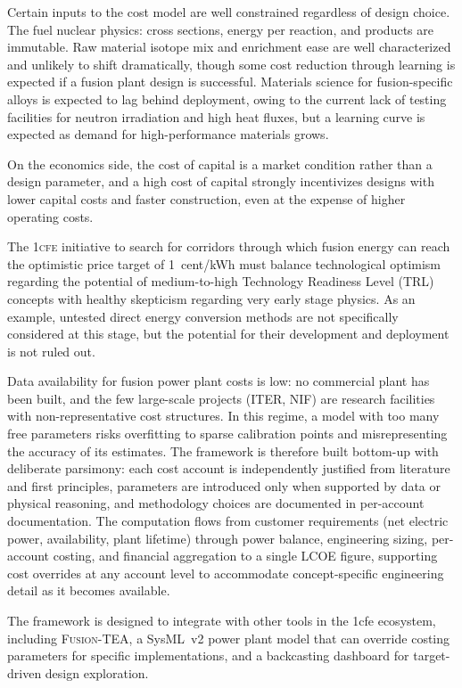 \documentclass{article}
\begin{document}
Certain inputs to the cost model are well constrained regardless of design
choice. The fuel nuclear physics: cross sections, energy per reaction, and
products are immutable. Raw material isotope mix and enrichment ease are
well characterized and unlikely to shift dramatically, though some cost
reduction through learning is expected if a fusion plant design is successful.
Materials science for fusion-specific alloys is expected to lag behind deployment,
owing to the current lack of testing facilities for neutron irradiation and high heat fluxes,
but a learning curve is expected as demand for high-performance materials grows.

On the economics side, the cost of capital is a market condition rather
than a design parameter, and a high cost of capital strongly incentivizes
designs with lower capital costs and faster construction, even at the
expense of higher operating costs.

The \textsc{1cfe} initiative to search for corridors through which fusion energy can reach the
optimistic price target of 1~cent/kWh must balance technological optimism regarding the
potential of medium-to-high Technology Readiness Level (TRL) concepts with healthy skepticism
regarding very early stage physics. As an example, untested direct energy conversion methods are
not specifically considered at this stage, but the potential for their development and deployment is not ruled out.

Data availability for fusion power plant costs is low: no commercial plant
has been built, and the few large-scale projects (ITER, NIF) are research
facilities with non-representative cost structures. In this regime, a model
with too many free parameters risks overfitting to sparse calibration points
and misrepresenting the accuracy of its estimates. The framework is therefore
built bottom-up with deliberate parsimony: each cost account is independently
justified from literature and first principles, parameters are introduced
only when supported by data or physical reasoning, and methodology choices
are documented in per-account documentation.
The computation flows from customer requirements (net electric
power, availability, plant lifetime) through power balance, engineering
sizing, per-account costing, and financial aggregation to a single LCOE
figure, supporting cost overrides at any account level to accommodate
concept-specific engineering detail as it becomes available.

The framework is designed to integrate with other tools in the 1cfe ecosystem,
including \textsc{Fusion-TEA}, a SysML~v2 power plant model that can override
costing parameters for specific implementations, and a backcasting dashboard
for target-driven design exploration.
\end{document}
